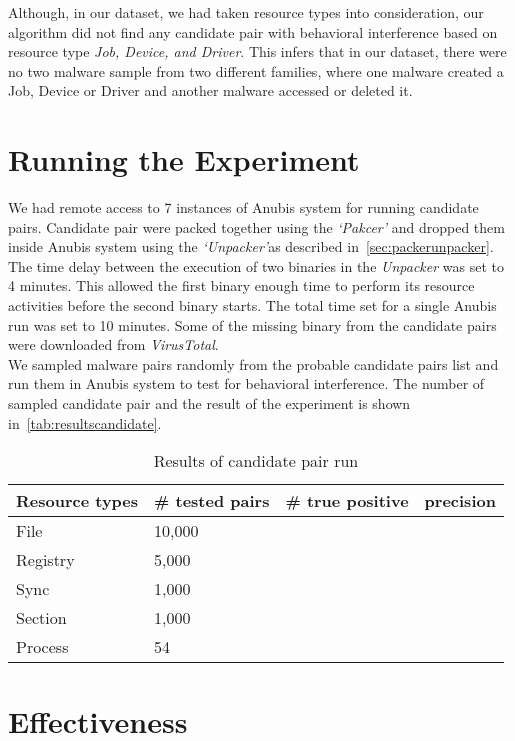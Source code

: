 Although, in our dataset, we had taken resource types {\getresourcetypes{}} into consideration, our algorithm did not find any candidate pair with behavioral interference based on resource type \emph{Job, Device, and Driver}.
This infers that in our dataset, there were no two malware sample from two different families, where one malware created a Job, Device or Driver and another malware accessed or deleted it.
\section{Running the Experiment}
\label{sec:Running the Experiment}
We had remote access to 7 instances of Anubis system for running candidate pairs.
Candidate pair were packed together using the \emph{`Pakcer'} and dropped them inside Anubis system using the \emph{`Unpacker'}as described in~\ref{sec:packerunpacker}.
The time delay between the execution of two binaries in the \emph{Unpacker} was set to 4 minutes.
This allowed the first binary enough time to perform its resource activities before the second binary starts.
The total time set for a single Anubis run was set to 10 minutes.
Some of the missing binary from the candidate pairs were downloaded from \emph{VirusTotal}.\\

We sampled malware pairs randomly from the probable candidate pairs list and run them in Anubis system to test for behavioral interference.
The number of sampled candidate pair and the result of the experiment is shown in~\autoref{tab:resultscandidate}.
\begin{table}[ht]
  \caption[Results of candidate pair run]{Results of candidate pair run}\label{tab:resultscandidate}
  \centering
  \begin{tabular}{l l l l}
    \toprule
    Resource types & \# tested pairs & \# true positive & precision\\
    \midrule
    File & 10,000\\
    Registry & 5,000\\
    Sync & 1,000\\
    Section & 1,000\\
    Process & 54\\
    \bottomrule
  \end{tabular}
\end{table}
\section{Effectiveness}
\label{sec:Effectiveness}

